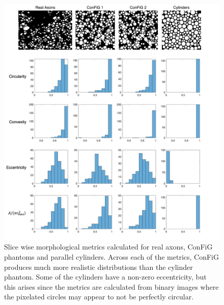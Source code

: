 \begin{figure}
  \centering
  \includegraphics[width=\textwidth]{figures/config/slice_wise_metrics_whitebg.png}
  \caption[Slice-wise microstructural measurements]{Slice wise morphological metrics calculated for real axons, \ac{ConFiG} phantoms and parallel cylinders. Across each of the metrics, \ac{ConFiG} produces much more realistic distributions than  the cylinder phantom. Some of the cylinders have a non-zero eccentricity, but this arises since the metrics are calculated from binary images where the pixelated circles may appear to not be perfectly circular.}
  \label{fig:config_res_slice_wise_metrics}
\end{figure}

